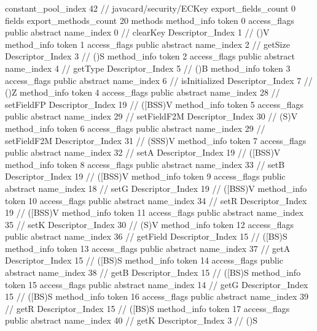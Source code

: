 {{{{				constant_pool_index	42		// javacard/security/ECKey
			}
			export_fields_count	0
			fields {
			}
			export_methods_count	20
			methods {
				method_info {
					token	0
					access_flags	public abstract
					name_index	0		// clearKey
					Descriptor_Index	1		// ()V
				}
				method_info {
					token	1
					access_flags	public abstract
					name_index	2		// getSize
					Descriptor_Index	3		// ()S
				}
				method_info {
					token	2
					access_flags	public abstract
					name_index	4		// getType
					Descriptor_Index	5		// ()B
				}
				method_info {
					token	3
					access_flags	public abstract
					name_index	6		// isInitialized
					Descriptor_Index	7		// ()Z
				}
				method_info {
					token	4
					access_flags	public abstract
					name_index	28		// setFieldFP
					Descriptor_Index	19		// ([BSS)V
				}
				method_info {
					token	5
					access_flags	public abstract
					name_index	29		// setFieldF2M
					Descriptor_Index	30		// (S)V
				}
				method_info {
					token	6
					access_flags	public abstract
					name_index	29		// setFieldF2M
					Descriptor_Index	31		// (SSS)V
				}
				method_info {
					token	7
					access_flags	public abstract
					name_index	32		// setA
					Descriptor_Index	19		// ([BSS)V
				}
				method_info {
					token	8
					access_flags	public abstract
					name_index	33		// setB
					Descriptor_Index	19		// ([BSS)V
				}
				method_info {
					token	9
					access_flags	public abstract
					name_index	18		// setG
					Descriptor_Index	19		// ([BSS)V
				}
				method_info {
					token	10
					access_flags	public abstract
					name_index	34		// setR
					Descriptor_Index	19		// ([BSS)V
				}
				method_info {
					token	11
					access_flags	public abstract
					name_index	35		// setK
					Descriptor_Index	30		// (S)V
				}
				method_info {
					token	12
					access_flags	public abstract
					name_index	36		// getField
					Descriptor_Index	15		// ([BS)S
				}
				method_info {
					token	13
					access_flags	public abstract
					name_index	37		// getA
					Descriptor_Index	15		// ([BS)S
				}
				method_info {
					token	14
					access_flags	public abstract
					name_index	38		// getB
					Descriptor_Index	15		// ([BS)S
				}
				method_info {
					token	15
					access_flags	public abstract
					name_index	14		// getG
					Descriptor_Index	15		// ([BS)S
				}
				method_info {
					token	16
					access_flags	public abstract
					name_index	39		// getR
					Descriptor_Index	15		// ([BS)S
				}
				method_info {
					token	17
					access_flags	public abstract
					name_index	40		// getK
					Descriptor_Index	3		// ()S
				}
}}}}
